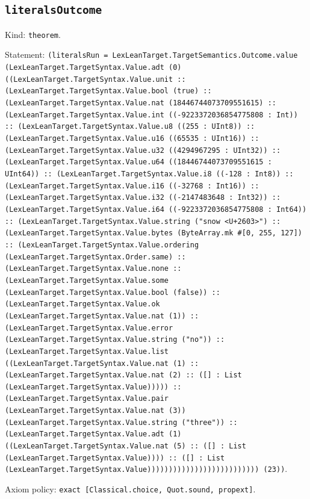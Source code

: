 \documentclass[11pt]{article}
\begin{document}
\subsection*{\texttt{literalsOutcome}}
\noindent Kind: \texttt{theorem}.\par
\noindent Statement: \texttt{(literalsRun = LexLeanTarget.TargetSemantics.Outcome.value (LexLeanTarget.TargetSyntax.Value.adt (0) ((LexLeanTarget.TargetSyntax.Value.unit :: (LexLeanTarget.TargetSyntax.Value.bool (true) :: (LexLeanTarget.TargetSyntax.Value.nat (18446744073709551615) :: (LexLeanTarget.TargetSyntax.Value.int ((-9223372036854775808 : Int)) :: (LexLeanTarget.TargetSyntax.Value.u8 ((255 : UInt8)) :: (LexLeanTarget.TargetSyntax.Value.u16 ((65535 : UInt16)) :: (LexLeanTarget.TargetSyntax.Value.u32 ((4294967295 : UInt32)) :: (LexLeanTarget.TargetSyntax.Value.u64 ((18446744073709551615 : UInt64)) :: (LexLeanTarget.TargetSyntax.Value.i8 ((-128 : Int8)) :: (LexLeanTarget.TargetSyntax.Value.i16 ((-32768 : Int16)) :: (LexLeanTarget.TargetSyntax.Value.i32 ((-2147483648 : Int32)) :: (LexLeanTarget.TargetSyntax.Value.i64 ((-9223372036854775808 : Int64)) :: (LexLeanTarget.TargetSyntax.Value.string ("snow <U+2603>") :: (LexLeanTarget.TargetSyntax.Value.bytes (ByteArray.mk \#[0, 255, 127]) :: (LexLeanTarget.TargetSyntax.Value.ordering (LexLeanTarget.TargetSyntax.Order.same) :: (LexLeanTarget.TargetSyntax.Value.none :: (LexLeanTarget.TargetSyntax.Value.some (LexLeanTarget.TargetSyntax.Value.bool (false)) :: (LexLeanTarget.TargetSyntax.Value.ok (LexLeanTarget.TargetSyntax.Value.nat (1)) :: (LexLeanTarget.TargetSyntax.Value.error (LexLeanTarget.TargetSyntax.Value.string ("no")) :: (LexLeanTarget.TargetSyntax.Value.list ((LexLeanTarget.TargetSyntax.Value.nat (1) :: (LexLeanTarget.TargetSyntax.Value.nat (2) :: ([] : List (LexLeanTarget.TargetSyntax.Value))))) :: (LexLeanTarget.TargetSyntax.Value.pair (LexLeanTarget.TargetSyntax.Value.nat (3)) (LexLeanTarget.TargetSyntax.Value.string ("three")) :: (LexLeanTarget.TargetSyntax.Value.adt (1) ((LexLeanTarget.TargetSyntax.Value.nat (5) :: ([] : List (LexLeanTarget.TargetSyntax.Value)))) :: ([] : List (LexLeanTarget.TargetSyntax.Value)))))))))))))))))))))))))) (23))}.\par
\noindent Axiom policy: \texttt{exact [Classical.choice, Quot.sound, propext]}.\par
\end{document}
